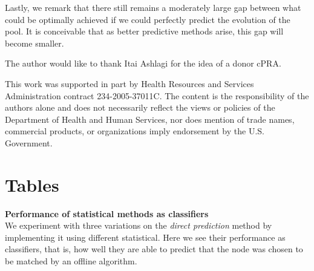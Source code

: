 \documentclass[format=acmsmall, review=false]{acmart}
\begin{document}
Lastly, we remark that there still remains a moderately large gap between what could be optimally achieved if we could perfectly predict the evolution of the pool. It is conceivable that as better predictive methods arise, this gap will become smaller. 



\begin{acks}
	

The author would like to thank Itai Ashlagi for the idea of a donor cPRA.

This work was supported in part by Health Resources and Services Administration contract 234-2005-37011C. The content is the responsibility of the authors alone and does not necessarily reflect the views or policies of the Department of Health and Human Services, nor does mention of trade names, commercial products, or organizations imply endorsement by the U.S. Government.

	
\end{acks}




\appendix

\section{Tables}



\begin{table}
  \centering
  \singlespacing
  \hspace*{-0.5cm}
  
   \caption{\textbf{Performance of statistical methods as classifiers} \\ 
   We experiment with three variations on the \emph{direct prediction} method by implementing it using different statistical. Here we see their performance as classifiers, that is, how well they are able to predict that the node was chosen to be matched by an offline algorithm. \\
  }
  \label{tab:traditional_ml_classifier}
\end{table}
\end{document}
